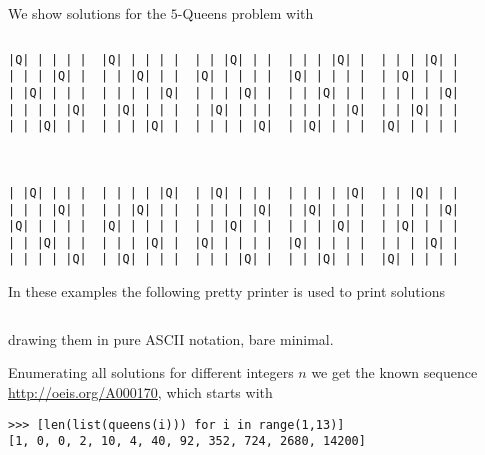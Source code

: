 
\begin{example}
We show solutions for the $5$-Queens problem with
\inputminted[fontsize=\small,]{python}{backtracking/5queens-enumeration-snippet.py}
\begin{Verbatim}[baselinestretch=0.1, fontsize=\small]
|Q| | | | |  |Q| | | | |  | | |Q| | |  | | | |Q| |  | | | |Q| |
| | | |Q| |  | | |Q| | |  |Q| | | | |  |Q| | | | |  | |Q| | | |
| |Q| | | |  | | | | |Q|  | | | |Q| |  | | |Q| | |  | | | | |Q|
| | | | |Q|  | |Q| | | |  | |Q| | | |  | | | | |Q|  | | |Q| | |
| | |Q| | |  | | | |Q| |  | | | | |Q|  | |Q| | | |  |Q| | | | |



| |Q| | | |  | | | | |Q|  | |Q| | | |  | | | | |Q|  | | |Q| | |
| | | |Q| |  | | |Q| | |  | | | | |Q|  | |Q| | | |  | | | | |Q|
|Q| | | | |  |Q| | | | |  | | |Q| | |  | | | |Q| |  | |Q| | | |
| | |Q| | |  | | | |Q| |  |Q| | | | |  |Q| | | | |  | | | |Q| |
| | | | |Q|  | |Q| | | |  | | | |Q| |  | | |Q| | |  |Q| | | | |
\end{Verbatim}
\end{example}

In these examples the following pretty printer is used to print solutions
\inputminted[fontsize=\small,firstline=35, lastline=44]{python}{backtracking/queens.py}
drawing them in pure ASCII notation, bare minimal.

Enumerating all solutions for different integers $n$ we get the known sequence
\url{http://oeis.org/A000170}, which starts with
\begin{verbatim}
>>> [len(list(queens(i))) for i in range(1,13)]
[1, 0, 0, 2, 10, 4, 40, 92, 352, 724, 2680, 14200]
\end{verbatim}

